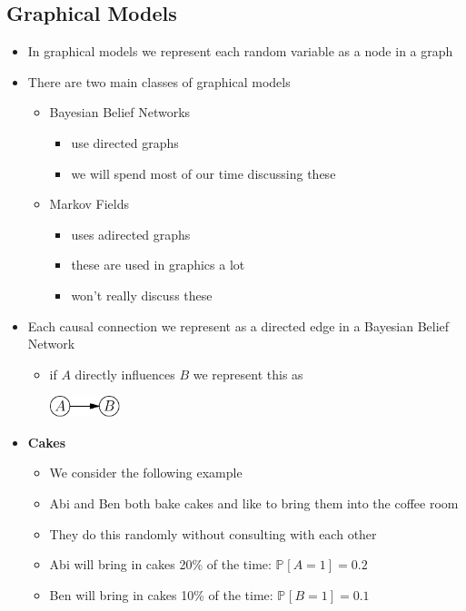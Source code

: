 \documentclass[11pt]{article}
\newcommand{\Prob}[2][]{\mathbb{P}_{#1\!}\left[ #2 \right]}
\begin{document}
\subsection{Graphical Models}
\label{sec:orgfedf571}
\begin{itemize}
\item In graphical models we represent each random variable as a node
in a graph
\item There are two main classes of graphical models
\begin{itemize}
\item Bayesian Belief Networks
\begin{itemize}
\item use directed graphs
\item we will spend most of our time discussing these
\end{itemize}
\item Markov Fields
\begin{itemize}
\item uses adirected graphs
\item these are used in graphics a lot
\item won't really discuss these
\end{itemize}
\end{itemize}
\item Each causal connection we represent as a directed edge in a
Bayesian Belief Network
\begin{itemize}
\item if \(A\) directly influences \(B\) we represent this as
\begin{center}
\includegraphics[width=0.17\textwidth]{figures/atob.pdf}
\end{center}
\end{itemize}
\item \textbf{Cakes}
\begin{itemize}
\item We consider the following example
\item Abi and Ben both bake cakes and like to bring them into the
coffee room
\item They do this randomly without consulting with each other
\item Abi will bring in cakes 20\% of the time: \(\Prob{A=1} = 0.2\)
\item Ben will bring in cakes 10\% of the time: \(\Prob{B=1} = 0.1\)

\end{itemize}
\end{itemize}
\end{document}
